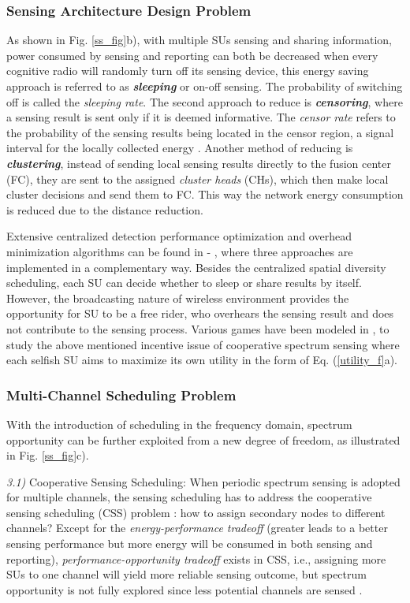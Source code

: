 \documentclass[journal,12pt,onecolumn]{IEEEtran}
\begin{document}
\subsubsection{Sensing Architecture Design Problem} As shown in Fig. \ref{ss_fig}b), with multiple SUs sensing and sharing information, power consumed by sensing  and reporting  can both be decreased when every cognitive radio will randomly turn off its sensing device, this energy saving approach is referred to as {\bf{\emph{sleeping}}} or on-off sensing. The probability of switching off is called the \emph{sleeping rate}. The second approach to reduce  is {\bf{\emph{censoring}}}, where a sensing result is sent only if it is deemed informative. The \emph{censor rate} refers to the probability of the sensing results being located in the censor region, a signal interval for the locally collected
energy \cite{spectrumSensingSurvey1}. Another method of reducing  is {\bf{\emph{clustering}}}, instead of sending local sensing results directly to the fusion center (FC), they are sent to the assigned \emph{cluster heads} (CHs), which then make local cluster decisions and send them to FC. This way the network energy consumption is reduced due to the distance reduction. 

Extensive centralized detection performance optimization and overhead minimization algorithms can be found in \cite{6036931} - \cite{DSS}, where three approaches are implemented in a complementary way. Besides the centralized spatial diversity scheduling, each SU can decide whether to sleep or share results by itself. However, the broadcasting nature of wireless environment provides the opportunity for SU to be a free rider, who overhears the sensing result and does not contribute to the sensing process. Various games have been modeled in \cite{5426522}, \cite{6503328} to study the above mentioned incentive issue of cooperative spectrum sensing where each selfish SU aims to maximize its own utility in the form of Eq. (\ref{utility_f}a).



\subsubsection{Multi-Channel Scheduling Problem} With the introduction of scheduling in the frequency domain, spectrum opportunity can be further exploited from a new degree of freedom, as illustrated in Fig. \ref{ss_fig}c).

\emph{3.1)} {Cooperative Sensing Scheduling:} When periodic spectrum sensing is adopted for multiple channels, the sensing scheduling has to address the cooperative sensing scheduling (CSS) problem \cite{cooperativeSS}: how to assign secondary nodes to different channels? Except for the \emph{energy-performance tradeoff} (greater  leads to a better sensing performance but more energy will be consumed in both sensing and reporting), \emph{performance-opportunity tradeoff} exists in CSS, i.e., assigning more SUs to one channel will yield more reliable sensing outcome, but spectrum opportunity is not fully explored since less potential channels are sensed \cite{traDEOFFss}.
\end{document}
